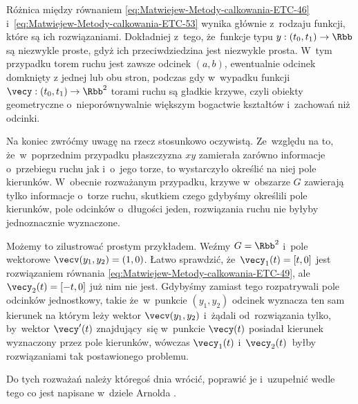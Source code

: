 \documentclass[a4paper,11pt]{article}
\numberwithin{equation}{section}
\begin{document}
Różnica między równaniem \eqref{eq:Matwiejew-Metody-calkowania-ETC-46}
i~\eqref{eq:Matwiejew-Metody-calkowania-ETC-53} wynika głównie z~rodzaju
funkcji, które są ich rozwiązaniami. Dokładniej z~tego, że~funkcje typu
$y : ( t_{ 0 }, t_{ 1 } ) \to \Rbb$ są niezwykle proste, gdyż ich
przeciwdziedzina jest niezwykle prosta. W~tym przypadku torem ruchu jest
zawsze odcinek $( a, b )$, ewentualnie odcinek domknięty z jednej lub obu
stron, podczas gdy w~wypadku funkcji
$\vecy : ( t_{ 0 }, t_{ 1 } ) \to \Rbb^{ 2 }$ torami ruchu są
gładkie krzywe, czyli obiekty geometryczne o~nieporównywalnie większym
bogactwie kształtów i~zachowań niż odcinki.

Na koniec zwróćmy uwagę na rzecz stosunkowo oczywistą. Ze~względu na to,
że~w~poprzednim przypadku płaszczyzna $xy$ zamierała zarówno informacje
o~przebiegu ruchu jak i~o~jego torze, to wystarczyło określić na niej pole
kierunków. W~obecnie rozważanym przypadku, krzywe w~obszarze $G$ zawierają
tylko informacje o~torze ruchu, skutkiem czego gdybyśmy określili pole
kierunków, pole odcinków o~długości jeden, rozwiązania ruchu nie byłyby
jednoznacznie wyznaczone.

Możemy to zilustrować prostym przykładem. Weźmy $G = \Rbb^{ 2 }$ i~pole
wektorowe $\vecv( y_{ 1 }, y_{ 2 } ) = ( 1, 0 )$. Łatwo sprawdzić,
że~$\vecy_{ 1 }( t ) = [ t, 0 ]$ jest rozwiązaniem równania
\eqref{eq:Matwiejew-Metody-calkowania-ETC-49},
ale~$\vecy_{ 2 }( t ) = [ -t, 0 ]$ już nim nie jest. Gdybyśmy zamiast tego
rozpatrywali pole odcinków jednostkowy, takie że~w~punkcie
$( y_{ 1 }, y_{ 2 } )$ odcinek wyznacza ten sam kierunek na którym leży
wektor $\vecv( y_{ 1 }, y_{ 2 } )$ i~żądali od~rozwiązania tylko,
by~wektor $\vecy'( t )$ znajdujący~się w~punkcie $\vecy( t )$ posiadał
kierunek wyznaczony przez pole kierunków, wówczas $\vecy_{ 1 }( t )$
i~$\vecy_{ 2 }( t )$~byłby rozwiązaniami tak postawionego problemu.

Do tych rozważań należy któregoś dnia wrócić, poprawić je i~uzupełnić wedle
tego co jest napisane w~dziele Arnolda
\cite{ArnoldRownaniaRozniczkoweZwyczajne1975}.

\VerSpaceFour
\end{document}
